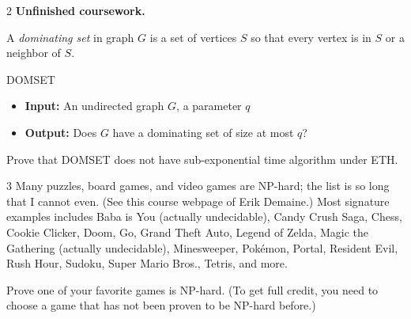 \documentclass[12pt]{article}
\begin{document}
\newpage

\begin{problem}{2}
    \textbf{Unfinished coursework.} 
    
    A \emph{dominating set} in graph $G$ is a set of vertices $S$ so that every vertex is in $S$ or a neighbor of $S$.

    \begin{tcolorbox}
    \textsc{DOMSET}
    \begin{itemize}
        \item \textbf{Input:} An undirected graph $G$, a parameter $q$
        \item \textbf{Output:} Does $G$ have a dominating set of size at most $q$?
    \end{itemize}
    \end{tcolorbox}

    Prove that \textsc{DOMSET} does not have sub-exponential time algorithm under ETH.
\end{problem}

\begin{problem}{3}
    Many puzzles, board games, and video games are NP-hard; the list is so long that I cannot even. (See this course webpage of Erik Demaine.) Most signature examples includes Baba is You (actually undecidable), Candy Crush Saga, Chess, Cookie Clicker, Doom, Go, Grand Theft Auto, Legend of Zelda, Magic the Gathering (actually undecidable), Minesweeper, Pokémon, Portal, Resident Evil, Rush Hour, Sudoku, Super Mario Bros., Tetris, and more.

    Prove one of your favorite games is NP-hard. (To get full credit, you need to choose a game that has not been proven to be NP-hard before.)
\end{problem}
\end{document}
